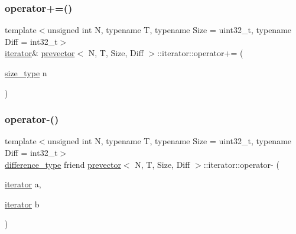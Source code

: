 \mbox{\label{classprevector_1_1iterator_a9d6cc2ddeb708d1c9dd4a066403303af}} 
\subsubsection{\texorpdfstring{operator+=()}{operator+=()}}
{\footnotesize\ttfamily template$<$unsigned int N, typename T, typename Size = uint32\+\_\+t, typename Diff = int32\+\_\+t$>$ \\
\mbox{\hyperlink{classprevector_1_1iterator}{iterator}}\& \mbox{\hyperlink{classprevector}{prevector}}$<$ N, T, Size, Diff $>$\+::iterator\+::operator+= (\begin{DoxyParamCaption}\item[{\mbox{\hyperlink{classprevector_a7e0da95e6d1c878f6eeb572f4fc12524}{size\+\_\+type}}}]{n }\end{DoxyParamCaption})\hspace{0.3cm}{\ttfamily [inline]}}

\mbox{\label{classprevector_1_1iterator_a42797a407d87e273e4ff450ac7db068a}} 
\subsubsection{\texorpdfstring{operator-\/()}{operator-()}\hspace{0.1cm}{\footnotesize\ttfamily [1/2]}}
{\footnotesize\ttfamily template$<$unsigned int N, typename T, typename Size = uint32\+\_\+t, typename Diff = int32\+\_\+t$>$ \\
\mbox{\hyperlink{classprevector_1_1iterator_a9540618843eb1657d30f7890d04ee6f0}{difference\+\_\+type}} friend \mbox{\hyperlink{classprevector}{prevector}}$<$ N, T, Size, Diff $>$\+::iterator\+::operator-\/ (\begin{DoxyParamCaption}\item[{\mbox{\hyperlink{classprevector_1_1iterator}{iterator}}}]{a,  }\item[{\mbox{\hyperlink{classprevector_1_1iterator}{iterator}}}]{b }\end{DoxyParamCaption})\hspace{0.3cm}{\ttfamily [inline]}}

